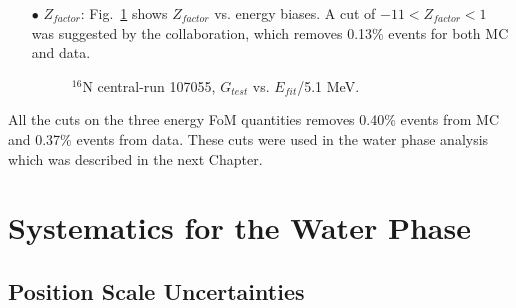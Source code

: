 \begin{itemize}
\item[$\bullet$]$Z_{factor}$:
Fig.~\ref{energyFOM_Zfactor} shows $Z_{factor}$ vs. energy biases. A cut of $-11<Z_{factor}<1$ was suggested by the collaboration, which removes 0.13\% events for both MC and data.		
\begin{figure}[!htb]
	\centering
	\caption{$^{16}$N central-run 107055, $G_{test}$ vs. $E_{fit}$/5.1 MeV.}
	\label{energyFOM_Zfactor}
\end{figure}


\end{itemize}

All the cuts on the three energy FoM quantities removes 0.40\% events from MC and 0.37\% events from data.
These cuts were used in the water phase analysis which was described in the next Chapter.



\section{Systematics for the Water Phase}

\subsection{Position Scale Uncertainties}

